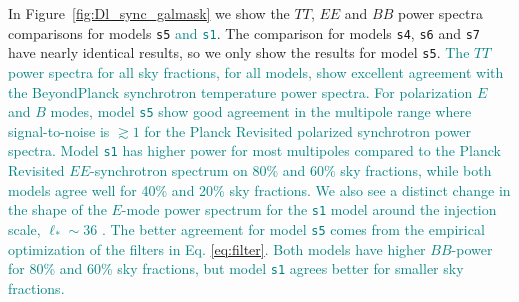 \documentclass[twocolumn]{aastex631}
\newcommand{\sg}[1]{\textcolor{teal}{#1}}
\begin{document}

In Figure~\ref{fig:Dl_sync_galmask} we show the $TT$, $EE$ and $BB$ power spectra comparisons for models \texttt{s5} \sg{and \texttt{s1}}. The comparison for models \texttt{s4}, \texttt{s6} and \texttt{s7} have nearly identical results, so we only show the results for model \texttt{s5}. \sg{The $TT$ power spectra for all sky fractions, for all models, show excellent agreement with the BeyondPlanck synchrotron temperature power spectra. For polarization $E$ and $B$ modes, model \texttt{s5} show good agreement in the multipole range where signal-to-noise is $\gtrsim 1$ for the Planck Revisited polarized synchrotron power spectra. Model \texttt{s1} has higher power for most multipoles compared to the Planck Revisited $EE$-synchrotron spectrum on 80\% and 60\% sky fractions, while both models agree well for 40\% and 20\% sky fractions. We also see a distinct change in the shape of the $E$-mode power spectrum for the \texttt{s1} model around the injection scale, $\ell_*\sim 36$ \citep{Thorne:2017}. The better agreement for model \texttt{s5} comes from the empirical optimization of the filters in Eq. \eqref{eq:filter}. Both models have higher $BB$-power for 80\% and 60\% sky fractions, but model \texttt{s1} agrees better for smaller sky fractions.}
\end{document}

